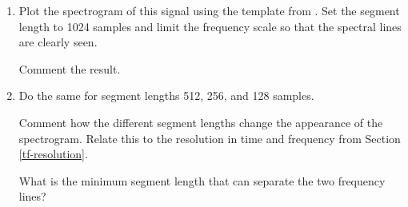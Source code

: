 \begin{enumerate}[1)]
\item Plot the spectrogram of this signal using the template from .
Set the segment length to 1024 samples and limit the frequency scale so that the spectral lines are clearly seen. 

Comment the result.	

\item Do the same for segment lengths 512, 256, and 128 samples.

Comment how the different segment lengths change the appearance of the spectrogram. 
Relate this to the resolution in time and frequency from Section \ref{tf-resolution}.

What is the minimum segment length that can separate the two frequency lines?

\end{enumerate}


